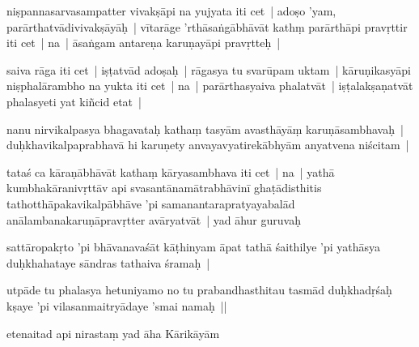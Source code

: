 \documentclass[article,12pt,a4paper]{memoir}%
\newcounter{parCount}
\begin{document}
	  \pstart \leavevmode%
	\label{thakur75-26.28}niṣpannasarvasampatter vivakṣāpi na yujyata iti cet | adoṣo 'yam, parārthatvādivivakṣāyāḥ | vītarāge 'rthāsaṅgābhāvāt kathṃ parārthāpi pravṛttir iti cet | na | āsaṅgam antareṇa karuṇayāpi pravṛtteḥ | 
	{}
	\pend%
      

	  \pstart \leavevmode%
	saiva rāga iti cet | iṣṭatvād adoṣaḥ | rāgasya tu svarūpam uktam | kāruṇikasyāpi niṣphalārambho na yukta iti cet | na | parārthasyaiva phalatvāt | iṣṭalakṣaṇatvāt phalasyeti yat kiñcid etat | 
	{}
	\pend%
      

	  \pstart \leavevmode%
	\label{thakur75-27.1}nanu nirvikalpasya bhagavataḥ kathaṃ tasyām avasthāyāṃ karuṇāsambhavaḥ | duḥkhavikalpaprabhavā hi karuṇety anvayavyatirekābhyām anyatvena niścitam | 
	{}
	\pend%
      

	  \pstart \leavevmode%
	\label{thakur75-27.3}tataś ca kāraṇābhāvāt kathaṃ kāryasambhava iti cet | na | yathā kumbhakāranivṛttāv api svasantānamātrabhāvinī ghaṭādisthitis tathotthāpakavikalpābhāve 'pi samanantarapratyayabalād anālambanakaruṇāpravṛtter avāryatvāt | yad āhur guruvaḥ 
	{}
	\pend%
      

	  \pstart \leavevmode%
	sattāropakṛto 'pi bhāvanavaśāt kāṭhinyam āpat tathā śaithilye 'pi yathāsya duḥkhahataye sāndras tathaiva śramaḥ | 
	{}
	\pend%
      

	  \pstart \leavevmode%
	utpāde tu phalasya hetuniyamo no tu prabandhasthitau tasmād duḥkhadṛśaḥ kṣaye 'pi vilasanmaitryādaye 'smai namaḥ || 
	{}
	\pend%
      

	  \pstart \leavevmode%
	etenaitad api nirastaṃ yad āha Kārikāyām 
	{}
	\pend%
      
\end{document}
